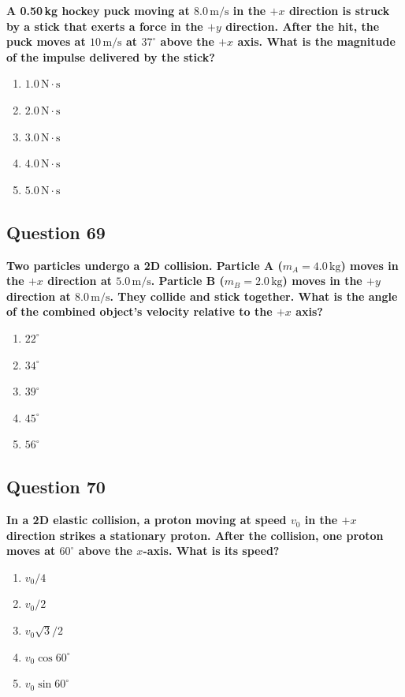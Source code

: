 \documentclass[12pt,letterpaper]{article}
\begin{document}
\begin{questionbox}
\textbf{A 0.50\,kg hockey puck moving at $8.0\,\text{m/s}$ in the $+x$ direction is struck by a stick that exerts a force in the $+y$ direction. After the hit, the puck moves at $10\,\text{m/s}$ at $37^\circ$ above the $+x$ axis. What is the magnitude of the impulse delivered by the stick?}

\begin{enumerate}[label=\alph*)]
    \item $1.0\,\text{N}\cdot\text{s}$
    \item $2.0\,\text{N}\cdot\text{s}$
    \item $3.0\,\text{N}\cdot\text{s}$
    \item $4.0\,\text{N}\cdot\text{s}$
    \item $5.0\,\text{N}\cdot\text{s}$
\end{enumerate}
\end{questionbox}

\subsection{Question 69}

\begin{questionbox}
\textbf{Two particles undergo a 2D collision. Particle A ($m_A = 4.0\,\text{kg}$) moves in the $+x$ direction at $5.0\,\text{m/s}$. Particle B ($m_B = 2.0\,\text{kg}$) moves in the $+y$ direction at $8.0\,\text{m/s}$. They collide and stick together. What is the angle of the combined object's velocity relative to the $+x$ axis?}

\begin{enumerate}[label=\alph*)]
    \item $22^\circ$
    \item $34^\circ$
    \item $39^\circ$
    \item $45^\circ$
    \item $56^\circ$
\end{enumerate}
\end{questionbox}

\subsection{Question 70}

\begin{questionbox}
\textbf{In a 2D elastic collision, a proton moving at speed $v_0$ in the $+x$ direction strikes a stationary proton. After the collision, one proton moves at $60^\circ$ above the $x$-axis. What is its speed?}

\begin{enumerate}[label=\alph*)]
    \item $v_0/4$
    \item $v_0/2$
    \item $v_0\sqrt{3}/2$
    \item $v_0\cos 60^\circ$
    \item $v_0\sin 60^\circ$
\end{enumerate}
\end{questionbox}
\end{document}
